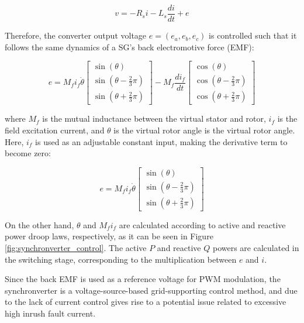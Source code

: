 \begin{equation*}
    v = -R_s i - L_s \frac{di}{dt} + e
\end{equation*}

Therefore, the converter output voltage $e = (e_a, e_b, e_c)$ is controlled such
that it follows the same dynamics of a SG's back electromotive force (EMF):

\begin{equation*}
    e = M_f i_f \dot{\theta} \begin{bmatrix} \sin{(\theta)} \\ \sin{(\theta - \frac{2}{3}\pi)} \\ \sin{(\theta + \frac{2}{3}\pi)}\end{bmatrix} - M_f \frac{di_f}{dt} \begin{bmatrix} \cos{(\theta)} \\ \cos{(\theta - \frac{2}{3}\pi)} \\ \cos{(\theta + \frac{2}{3}\pi)}\end{bmatrix}
\end{equation*}

\noindent where $M_f$ is the mutual inductance between the virtual stator and
rotor, $i_f$ is the field excitation current, and $\theta$ is the virtual rotor
angle is the virtual rotor angle. Here, $i_f$ is used as an adjustable constant
input, making the derivative term to become zero:

\begin{equation*}
    e = M_f i_f \dot{\theta} \begin{bmatrix} \sin{(\theta)} \\ \sin{(\theta - \frac{2}{3}\pi)} \\ \sin{(\theta + \frac{2}{3}\pi)}\end{bmatrix}
\end{equation*}

On the other hand, $\theta$ and $M_f i_f$ are calculated according to active and
reactive power droop laws, respectively, as it can be seen in Figure
\ref{fig:synchronverter_control}. The active $P$ and reactive $Q$ powers are
calculated in the switching stage, corresponding to the multiplication between
$e$ and $i$.

Since the back EMF is used as a reference voltage for PWM modulation, the
synchronverter is a voltage-source-based grid-supporting control method, and due
to the lack of current control gives rise to a potential issue related to
excessive high inrush fault current\cite{shuai2017characteristics}.

